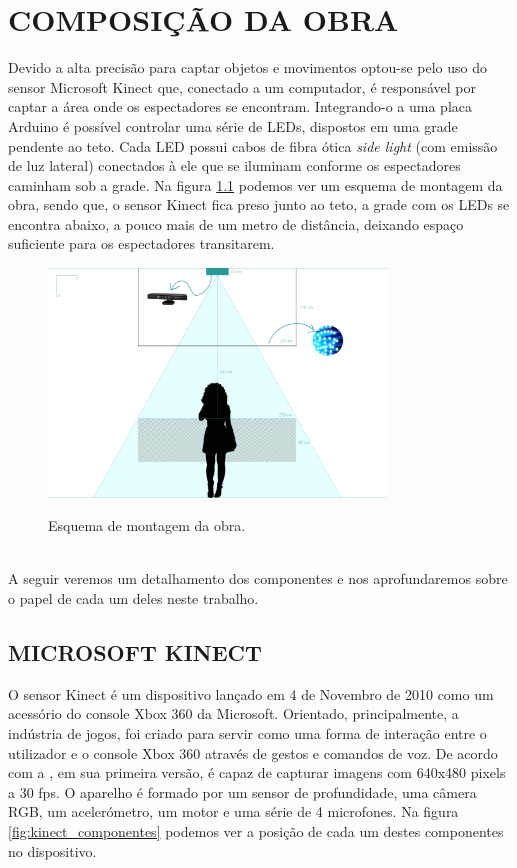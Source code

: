 \chapter{COMPOSIÇÃO DA OBRA}

Devido a alta precisão para captar objetos e movimentos optou-se pelo uso do sensor Microsoft Kinect que, conectado a um computador, é responsável por captar a área onde os espectadores se encontram. Integrando-o a uma placa Arduino é possível controlar uma série de LEDs, dispostos em uma grade pendente ao teto. Cada LED possui cabos de fibra ótica \textit{side light} (com emissão de luz lateral) conectados à ele que se iluminam conforme os espectadores caminham sob a grade. Na figura \ref{fig:esquema} podemos ver um esquema de montagem da obra, sendo que, o sensor Kinect fica preso junto ao teto, a grade com os LEDs se encontra abaixo, a pouco mais de um metro de distância, deixando espaço suficiente para os espectadores transitarem.

\begin{figure}[H]
    \centering
    \caption{Esquema de montagem da obra.}
	\vspace*{0,2cm}
    \includegraphics[width=0.8\textwidth]{./04-figuras/esquema}
    \label{fig:esquema}
\end{figure}
\vspace*{-0,9cm}
{\raggedright {}}\\

A seguir veremos um detalhamento dos componentes e nos aprofundaremos sobre o papel de cada um deles neste trabalho. 

\section{MICROSOFT KINECT}

O sensor Kinect é um dispositivo lançado em 4 de Novembro de 2010 como um acessório do console Xbox 360 da Microsoft. Orientado, principalmente, a indústria de jogos, foi criado para servir como uma forma de interação entre o utilizador e o console Xbox 360 através de gestos e comandos de voz. De acordo com a , em sua primeira versão, é capaz de capturar imagens com 640x480 pixels a 30 fps. O aparelho é formado por um sensor de profundidade, uma câmera RGB, um acelerómetro, um motor e uma série de 4 microfones. Na figura \ref{fig:kinect_componentes} podemos ver a posição de cada um destes componentes no dispositivo.

